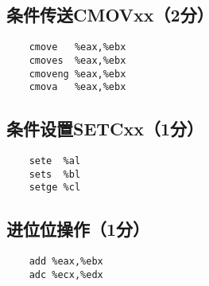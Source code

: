 \subsection{条件传送CMOVxx（2分）}
\begin{lstlisting}
    cmove   %eax,%ebx
    cmoves  %eax,%ebx
    cmoveng %eax,%ebx
    cmova   %eax,%ebx
\end{lstlisting}

\subsection{条件设置SETCxx（1分）}
\begin{lstlisting}
    sete  %al
    sets  %bl
    setge %cl
\end{lstlisting}

\subsection{进位位操作（1分）}
\begin{lstlisting}
    add %eax,%ebx
    adc %ecx,%edx
\end{lstlisting}